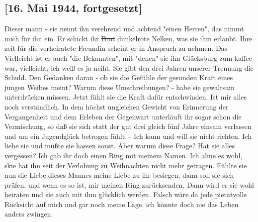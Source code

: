 \subsection{{\color{red} [16. Mai 1944, fortgesetzt] }}

Dieser mann - sie nennt ihn verehrend und achtend "einen Herren", das nimmt mich f\"{u}r ihn ein.
Er schickt ihr \st{Brot} dunkelrote Nelken, was sie ihm erlaubt.
Ihre zeit f\"{u}r die verheiratete Freundin scheint er in Anspruch zu nehmen.
\st{Das} Vielleicht ist er auch "die Bekannten", mit "denen" sie ihn Gl\"{u}cksburg zum kaffee war, vielleicht, ich wei{\ss} es ja nciht.
Sie gibt den drei Jahren unserer Trennung die Schuld.
Den Gedanken daran - ob sie die Gef\"{u}hle der gesunden Kraft eines jungen Weibes meint? Warum diese Umschreibungen? - habe sie gewaltsam unterdr\"{u}cken m\"{u}ssen.
Jetzt f\"{u}hlt sie die Kraft daf\"{u}r entschwinden.
Ist mir alles noch verst\"{a}ndlich.
In dem h\"{o}chst ungleichen Gewicht von Erinnerung der Vergangenheit und dem Erleben der Gegenwart unterl\"{a}uft ihr sogar schon die Vermischung, so da{\ss} sie sich statt der gut drei gleich f\"{u}nf Jahre einsam verlassen und um ein Jugendgl\"{u}ck betrogen f\"{u}hlt.
- Ich kann und will sie nicht richten.
Ich liebe sie und m\"{u}{\ss}te sie hassen sonst.
Aber warum diese Frage?
Hat sie alles vergessen?
Ich gab ihr doch einen Ring mit meinem Namen.
Ich ahne es wohl, skie hat ihn seit der Verlobung zu Weihnachten nicht mehr getragen.
F\"{u}hlte sie nun die Liebe dieses Mannes meine Liebe zu ihr besiegen, dann soll sie sich pr\"{u}fen, und wenn es so ist, mir meinen Ring zur\"{u}cksenden.
Dann wird er sie wohl heiraten und sie auch mit ihm gl\"{u}cklich werden.
Falsch w\"{a}re da jede piet\"{a}tvolle R\"{u}cksicht auf mich und gar noch meine Lage. ich k\"{o}nnte doch nie das Leben anders zwingen.

\clearpage
